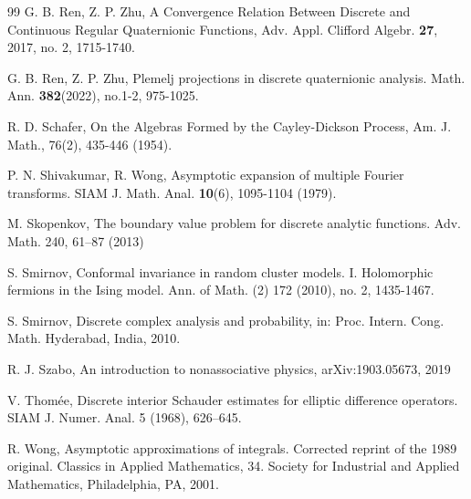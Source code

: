 \documentclass{amsart}
\theoremstyle{definition}
\theoremstyle{remark}
\numberwithin{equation}{section}
\begin{document}
\begin{thebibliography}{99}
G. B. Ren, Z. P.  Zhu,
 {A Convergence Relation Between Discrete
	and Continuous Regular Quaternionic
	Functions},  Adv. Appl. Clifford Algebr. \textbf{27}, 2017, no. 2, 1715-1740.

G. B.  Ren, Z. P. Zhu,
 {Plemelj projections in discrete quaternionic analysis}. Math. Ann. \textbf{382}(2022), no.1-2, 975-1025.



R. D. Schafer,
 {On the Algebras Formed by the Cayley-Dickson Process}, Am. J. Math.,  {76}(2), 435-446 (1954).




P. N. Shivakumar, R. Wong,  {Asymptotic expansion of multiple Fourier transforms}. SIAM J. Math. Anal. \textbf{10}(6), 1095-1104 (1979).




M. Skopenkov,  The boundary value problem for discrete analytic functions. Adv. Math. 240, 61–87
(2013)



S. Smirnov,   Conformal invariance in random cluster models. I. Holomorphic fermions in the Ising model. Ann. of Math. (2) 172 (2010), no. 2, 1435-1467.



S. Smirnov, Discrete complex analysis and probability, in: Proc. Intern. Cong. Math. Hyderabad, India, 2010.




R. J. Szabo,  An introduction to nonassociative physics,
arXiv:1903.05673, 2019








V. Thomée,  Discrete interior Schauder estimates for elliptic difference operators.
SIAM J. Numer. Anal. 5 (1968), 626–645.




R. Wong,   Asymptotic approximations of integrals. Corrected reprint of the 1989 original. Classics in Applied Mathematics, 34. Society for Industrial and Applied Mathematics, Philadelphia, PA, 2001.



\bigskip\bigskip\bigskip
\end{thebibliography}
\end{document}
